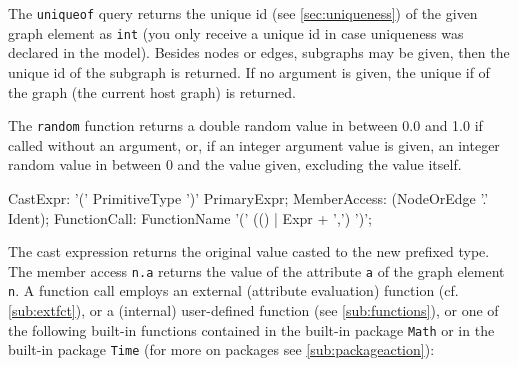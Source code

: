 The \texttt{uniqueof} query returns the unique id (see \ref{sec:uniqueness}) of the given graph element as \texttt{int}
(you only receive a unique id in case uniqueness was declared in the model).
Besides nodes or edges, subgraphs may be given, then the unique id of the subgraph is returned.
If no argument is given, the unique if of the graph (the current host graph) is returned.

The \texttt{random} function returns a double random value in between 0.0 and 1.0 if called without an argument,
or, if an integer argument value is given, an integer random value in between 0 and the value given, excluding the value itself.

\begin{rail}
  CastExpr: '(' PrimitiveType ')' PrimaryExpr;
  MemberAccess: (NodeOrEdge '.' Ident);
  FunctionCall: FunctionName '(' (() | Expr + ',') ')';
\end{rail}

The cast expression returns the original value casted to the new prefixed type.
The member access \texttt{n.a} returns the value of the attribute \texttt{a} of the graph element \texttt{n}.
A function call employs an external (attribute evaluation) function (cf. \ref{sub:extfct}), or a (internal) user-defined function (see \ref{sub:functions}), or one of the following built-in functions contained in the built-in package \texttt{Math} or in the built-in package \texttt{Time} (for more on packages see \ref{sub:packageaction}):

